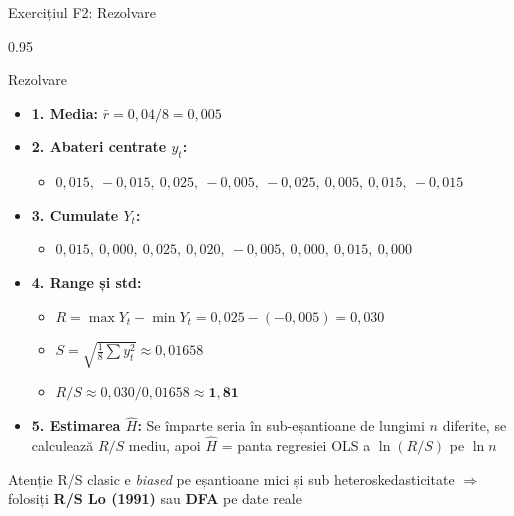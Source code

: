 \documentclass[9pt, aspectratio=169, t]{beamer}
\begin{document}
\begin{frame}[shrink=25]{Exercițiul F2: Rezolvare}
\begin{cminipage}{0.95\textwidth}
\begin{exampleblock}{Rezolvare}
\small
\begin{itemize}\setlength{\itemsep}{0pt}
    \item \textbf{1. Media:} $\bar r = 0{,}04/8 = 0{,}005$
    \item \textbf{2. Abateri centrate $y_t$:}
    \begin{itemize}\setlength{\itemsep}{0pt}
        \item $0{,}015,\ -0{,}015,\ 0{,}025,\ -0{,}005,\ -0{,}025,\ 0{,}005,\ 0{,}015,\ -0{,}015$
    \end{itemize}
    \item \textbf{3. Cumulate $Y_t$:}
    \begin{itemize}\setlength{\itemsep}{0pt}
        \item $0{,}015,\ 0{,}000,\ 0{,}025,\ 0{,}020,\ -0{,}005,\ 0{,}000,\ 0{,}015,\ 0{,}000$
    \end{itemize}
    \item \textbf{4. Range și std:}
    \begin{itemize}\setlength{\itemsep}{0pt}
        \item $R = \max Y_t - \min Y_t = 0{,}025 - (-0{,}005) = 0{,}030$
        \item $S = \sqrt{\frac{1}{8}\sum y_t^2} \approx 0{,}01658$
        \item $R/S \approx 0{,}030/0{,}01658 \approx \mathbf{1{,}81}$
    \end{itemize}
    \item \textbf{5. Estimarea $\hat H$:} Se împarte seria în sub-eșantioane de lungimi $n$ diferite, se calculează $R/S$ mediu, apoi $\hat H$ = panta regresiei OLS a $\ln(R/S)$ pe $\ln n$
\end{itemize}
\end{exampleblock}
\begin{alertblock}{Atenție}
R/S clasic e \emph{biased} pe eșantioane mici și sub heteroskedasticitate $\Rightarrow$ folosiți \textbf{R/S Lo (1991)} sau \textbf{DFA} pe date reale
\end{alertblock}
\end{cminipage}
\end{frame}
\end{document}
